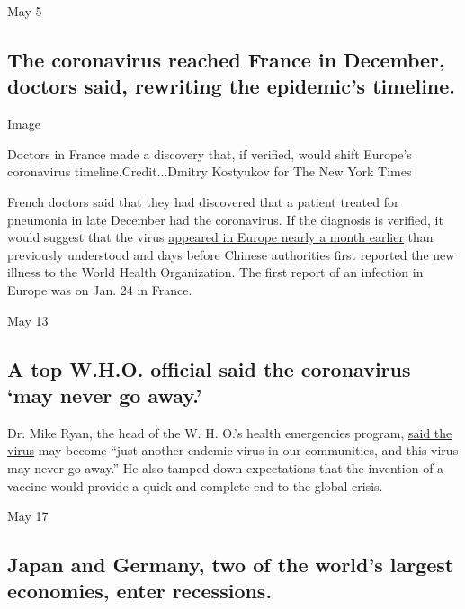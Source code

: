 May 5

\hypertarget{the-coronavirus-reached-france-in-december-doctors-said-rewriting-the-epidemics-timeline}{%
\subsection{The coronavirus reached France in December, doctors said,
rewriting the epidemic's
timeline.}\label{the-coronavirus-reached-france-in-december-doctors-said-rewriting-the-epidemics-timeline}}

Image

Doctors in France made a discovery that, if verified, would shift
Europe's coronavirus timeline.Credit...Dmitry Kostyukov for The New York
Times

French doctors said that they had discovered that a patient treated for
pneumonia in late December had the coronavirus. If the diagnosis is
verified, it would suggest that the virus
\href{https://www.nytimes3xbfgragh.onion/2020/05/05/world/europe/france-coronavirus-timeline.html?action=click\&module=RelatedLinks\&pgtype=Article}{appeared
in Europe nearly a month earlier} than previously understood and days
before Chinese authorities first reported the new illness to the World
Health Organization. The first report of an infection in Europe was on
Jan. 24 in France.

May 13

\hypertarget{a-top-who-official-said-the-coronavirus-may-never-go-away}{%
\subsection{A top W.H.O. official said the coronavirus `may never go
away.'}\label{a-top-who-official-said-the-coronavirus-may-never-go-away}}

Dr. Mike Ryan, the head of the W. H. O.'s health emergencies program,
\href{https://twitter.com/WHO/status/1260591340393357312}{said the
virus} may become ``just another endemic virus in our communities, and
this virus may never go away.'' He also tamped down expectations that
the invention of a vaccine would provide a quick and complete end to the
global crisis.

May 17

\hypertarget{japan-and-germany-two-of-the-worlds-largest-economies-enter-recessions}{%
\subsection{Japan and Germany, two of the world's largest economies,
enter
recessions.}\label{japan-and-germany-two-of-the-worlds-largest-economies-enter-recessions}}

